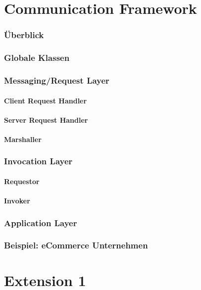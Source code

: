 \documentclass[a4paper,11pt]{article}
\begin{document}
\part*{Communication Framework}
\section{\"{U}berblick}

\section{Globale Klassen}

\section{Messaging/Request Layer}
\subsection{Client Request Handler}
\subsection{Server Request Handler}
\subsection{Marshaller}

\section{Invocation Layer}
\subsection{Requestor}
\subsection{Invoker}

\section{Application Layer}

\section{Beispiel: eCommerce Unternehmen}


\part*{Extension 1}
\end{document}
